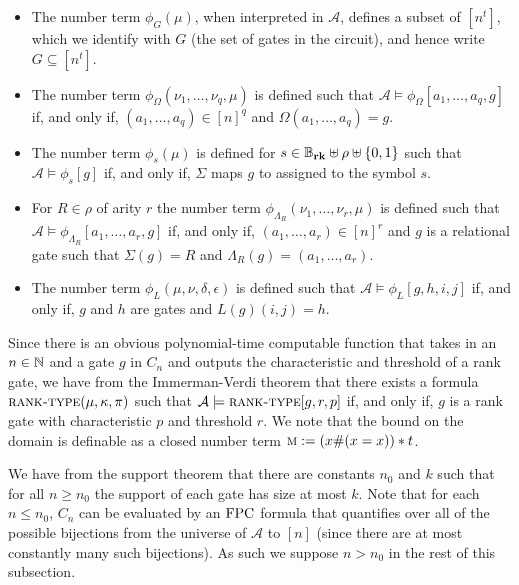 \documentclass[../paper.tex]{subfiles}
\begin{document}
\begin{itemize}
	\setlength\itemsep{0mm}
\item The number term $\phi_G(\mu)$, when interpreted in $\mathcal{A}$, defines
  a subset of $[n^t]$, which we identify with $G$ (the set of gates in the
  circuit), and hence write $G \subseteq [n^t]$.
\item The number term $\phi_{\Omega}(\nu_1, \ldots , \nu_q, \mu)$ is defined
  such that $\mathcal{A} \models \phi_\Omega[a_1, \ldots, a_q, g]$ if, and only
  if, $(a_1, \ldots, a_q) \in [n]^q$ and $\Omega(a_1, \ldots, a_q) = g$.
\item The number term $\phi_s (\mu)$ is defined for $s \in \mathbb{B}_{\text{\textbf{rk}}} \uplus \rho
  \uplus \{0,1\}$ such that $\mathcal{A} \models \phi_s [g]$ if, and only if,
  $\Sigma$ maps $g$ to assigned to the symbol $s$.
	      	      
\item For $R \in \rho$ of arity $r$ the number term $\phi_{\Lambda_R}(\nu_1,
  \ldots, \nu_r, \mu)$ is defined such that $\mathcal{A} \models
  \phi_{\Lambda_R} [a_1, \ldots, a_r, g]$ if, and only if, $(a_1, \ldots,
  a_r)\in [n]^r$ and $g$ is a relational gate such that $\Sigma (g) = R$ and
  $\Lambda_R (g) = (a_1, \ldots, a_r)$.
\item The number term $\phi_L(\mu, \nu, \delta, \epsilon)$ is defined such that
  $\mathcal{A} \models \phi_L[g,h,i,j]$ if, and only if, $g$ and $h$ are gates
  and $L(g)(i,j) = h$.
\end{itemize}

Since there is an obvious polynomial-time computable function that takes in an
$n \in \mathbb{N}$ and a gate $g$ in $C_n$ and outputs the characteristic and
threshold of a rank gate, we have from the Immerman-Verdi theorem that there
exists a formula $\textsc{rank-type}(\mu, \kappa , \pi)$ such that $\mathcal{A}
\models \textsc{rank-type}[g, r, p]$ if, and only if, $g$ is a rank gate with
characteristic $p$ and threshold $r$. We note that the bound on the domain is
definable as a closed number term $\textsc{m} := (x\# (x = x))*t$.

We have from the support theorem that there are constants $n_0$ and $k$ such
that for all $n \geq n_0$ the support of each gate has size at most $k$. Note
that for each $n \leq n_0$, $C_n$ can be evaluated by an $\text{\upshape FPC}$ formula that
quantifies over all of the possible bijections from the universe of
$\mathcal{A}$ to $[n]$ (since there are at most constantly many such
bijections). As such we suppose $n > n_0$ in the rest of this subsection.
\end{document}
